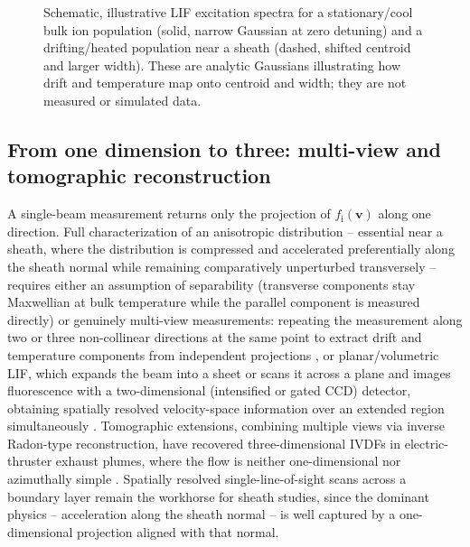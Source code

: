 \begin{figure}[h]
\centering
{}
\caption{Schematic, illustrative LIF excitation spectra for a stationary/cool bulk ion population (solid, narrow Gaussian at zero detuning) and a drifting/heated population near a sheath (dashed, shifted centroid and larger width). These are analytic Gaussians illustrating how drift and temperature map onto centroid and width; they are not measured or simulated data.}
\label{fig:lif-doppler-schematic}
\end{figure}

\subsection{From one dimension to three: multi-view and tomographic reconstruction}

A single-beam measurement returns only the projection of $f_{\mathrm{i}}(\mathbf{v})$ along one direction. Full characterization of an anisotropic distribution -- essential near a sheath, where the distribution is compressed and accelerated preferentially along the sheath normal while remaining comparatively unperturbed transversely -- requires either an assumption of separability (transverse components stay Maxwellian at bulk temperature while the parallel component is measured directly) or genuinely multi-view measurements: repeating the measurement along two or three non-collinear directions at the same point to extract drift and temperature components from independent projections \cite{ref0347}, or planar/volumetric LIF, which expands the beam into a sheet or scans it across a plane and images fluorescence with a two-dimensional (intensified or gated CCD) detector, obtaining spatially resolved velocity-space information over an extended region simultaneously \cite{ref0304}. Tomographic extensions, combining multiple views via inverse Radon-type reconstruction, have recovered three-dimensional IVDFs in electric-thruster exhaust plumes, where the flow is neither one-dimensional nor azimuthally simple \cite{ref0328}. Spatially resolved single-line-of-sight scans across a boundary layer remain the workhorse for sheath studies, since the dominant physics -- acceleration along the sheath normal -- is well captured by a one-dimensional projection aligned with that normal.

